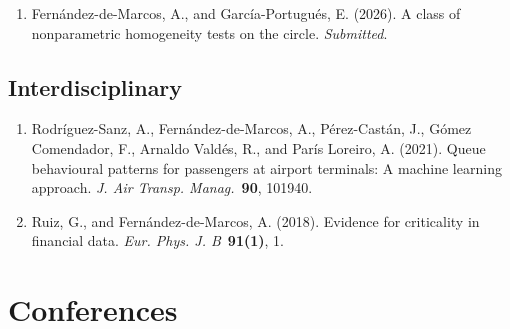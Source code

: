 \begin{enumerate}
  \item Fernández-de-Marcos, A., and García-Portugués, E. (2026). A class of nonparametric homogeneity tests on the circle. \emph{Submitted}. 
\end{enumerate}

\subsection*{Interdisciplinary}

\begin{enumerate}
  \item Rodríguez-Sanz, A., Fernández-de-Marcos, A., Pérez-Castán, J., Gómez Comendador, F., Arnaldo Valdés, R., and París Loreiro, A. (2021). Queue behavioural patterns for passengers at airport terminals: A machine learning approach. \emph{J. Air Transp. Manag.}~\textbf{90}, 101940. 
  \item Ruiz, G., and Fernández-de-Marcos, A. (2018). Evidence for criticality in financial data. \emph{Eur. Phys. J. B}~\textbf{91(1)}, 1.  
\end{enumerate}

\section*{Conferences}


